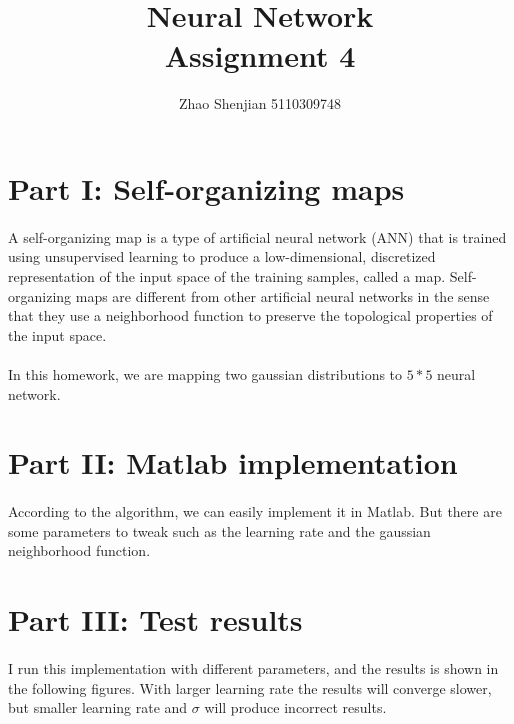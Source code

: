 \documentclass[a4paper,12pt]{article}
\title{	
\normalfont \normalsize \vspace{-13em} %
\horrule{1pt} \\[0.5cm] %
\huge Neural Network
\\ %
\vspace{1em}
\large Assignment 4
\horrule{2pt} \\[0.5cm] %
}
\author{Zhao Shenjian 5110309748}
\date{}
\begin{document}
   
\maketitle
\thispagestyle{empty}
\setcounter{page}{1}
\section*{Part I: Self-organizing maps}
  \paragraph{}A self-organizing map is a type of artificial neural network (ANN) that is trained using unsupervised learning to produce a low-dimensional,
  discretized representation of the input space of the training samples, called a map. 
  Self-organizing maps are different from other artificial neural networks in the sense that they use a neighborhood function to preserve the 
  topological properties of the input space.
  \paragraph{} In this homework, we are mapping two gaussian distributions to $ 5*5 $ neural network.
  
 \section*{Part II: Matlab implementation}
 \paragraph{} According to the algorithm, we can easily implement it in Matlab. But there are some parameters to tweak such as the learning rate and the 
 gaussian neighborhood function.

 \section*{Part III: Test results}
\paragraph{} I run this implementation with different parameters, and the results is shown in the following figures.
With larger learning rate the results will converge slower, but smaller learning rate and $\sigma$ will produce
incorrect results.

 
 
\end{document}

